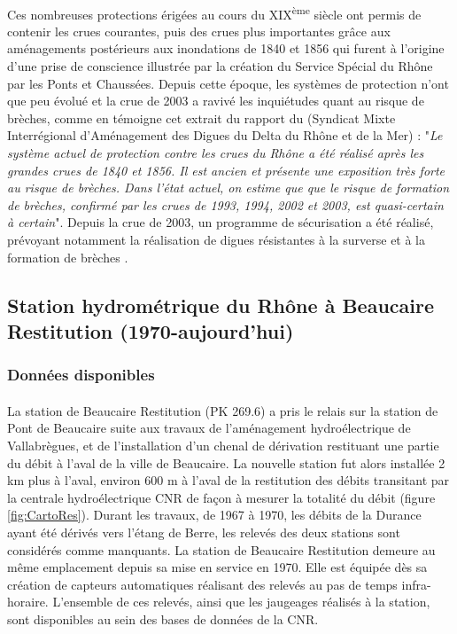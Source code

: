		\paragraph{} Ces nombreuses protections érigées au cours du XIX\textsuperscript{ème} siècle ont permis de contenir les crues courantes, puis des crues plus importantes grâce aux aménagements postérieurs aux inondations de 1840 et 1856 qui furent à l'origine d'une prise de conscience illustrée par la création du Service Spécial du Rhône par les Ponts et Chaussées. Depuis cette époque, les systèmes de protection n'ont que peu évolué et la crue de 2003 a ravivé les inquiétudes quant au risque de brèches, comme en témoigne cet extrait du rapport du \citet{symadrem_programme_2012} (Syndicat Mixte Interrégional d'Aménagement des Digues du Delta du Rhône et de la Mer) : "\textit{Le système actuel de protection contre les crues du Rhône a été réalisé après les grandes crues de 1840 et 1856. Il est ancien et présente une exposition très forte au risque de brèches. Dans l'état actuel, on estime que que le risque de formation de brèches, confirmé par les crues de 1993, 1994, 2002 et 2003, est quasi-certain à certain}". Depuis la crue de 2003, un programme de sécurisation a été réalisé, prévoyant notamment la réalisation de digues résistantes à la surverse et à la formation de brèches \citep{symadrem_programme_2012}.    
		
	
\FloatBarrier
	\subsection{Station hydrométrique du Rhône à Beaucaire Restitution (1970-aujourd'hui)}
	
	\subsubsection{Données disponibles}

	\paragraph{} La station de Beaucaire Restitution (PK 269.6) a pris le relais sur la station de Pont de Beaucaire suite aux travaux de l'aménagement hydroélectrique de Vallabrègues, et de l'installation d'un chenal de dérivation restituant une partie du débit à l'aval de la ville de Beaucaire. La nouvelle station fut alors installée 2 km plus à l'aval, environ 600 m à l'aval de la restitution des débits transitant par la centrale hydroélectrique CNR de façon à mesurer la totalité du débit (figure \ref{fig:CartoRes}). Durant les travaux, de 1967 à 1970, les débits de la Durance ayant été dérivés vers l'étang de Berre, les relevés des deux stations sont considérés comme manquants. La station de Beaucaire Restitution demeure au même emplacement depuis sa mise en service en 1970. Elle est équipée dès sa création de capteurs automatiques réalisant des relevés au pas de temps infra-horaire. L'ensemble de ces relevés, ainsi que les jaugeages réalisés à la station, sont disponibles au sein des bases de données de la CNR.
		
